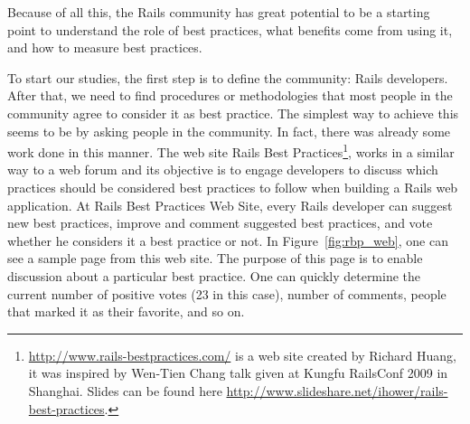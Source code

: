 Because of all this, the Rails community has great potential to be a starting point to understand the role of best practices, 
what benefits come from using it, and how to measure best practices.

To start our studies, the first step is to define the community: Rails developers. 
After that, we need to find procedures or methodologies that most people in the community agree to consider it as best practice.
The simplest way to achieve this seems to be by asking people in the community. 
In fact, there was already some work done in this manner.
The web site
\textsf{Rails Best Practices}\footnote{\url{http://www.rails-bestpractices.com/} is a web site created by Richard Huang,
it was inspired by Wen-Tien Chang talk given at Kungfu RailsConf 2009 in Shanghai. Slides can be found here
\url{http://www.slideshare.net/ihower/rails-best-practices}.},
works in a similar way to a web forum and its objective is to engage developers to discuss which practices
should be considered best practices to follow when building a Rails web application.
At Rails Best Practices Web Site, every Rails developer can suggest new best practices,
improve and comment suggested best practices, and vote whether he considers it a best practice or not.
In Figure~\ref{fig:rbp_web}, one can see a sample page from this web site.
The purpose of this page is to enable discussion about a particular best practice.
One can quickly determine the current number of positive votes (23 in this case), number of comments, 
people that marked it as their favorite,  and so on.

